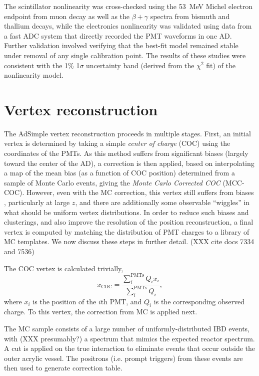 \documentclass[../thesis.tex]{subfiles}
\begin{document}
The scintillator nonlinearity was cross-checked using the 53~MeV Michel electron
endpoint from muon decay as well as the $\beta+\gamma$ spectra from bismuth and
thallium decays, while the electronics nonlinearity was validated using data
from a fast ADC system that directly recorded the PMT waveforms in one
AD. Further validation involved verifying that the best-fit model remained
stable under removal of any single calibration point. The results of these
studies were consistent with the 1\% 1$\sigma$ uncertainty band (derived from
the $\chi^2$ fit) of the nonlinearity model.

\section{Vertex reconstruction}
\label{sec:reconVertex}

The AdSimple vertex reconstruction proceeds in multiple stages. First, an
initial vertex is determined by taking a simple \emph{center of charge} (COC)
using the coordinates of the PMTs. As this method suffers from significant
biases (largely toward the center of the AD), a correction is then applied,
based on interpolating a map of the mean bias (as a function of COC position)
determined from a sample of Monte Carlo events, giving the \emph{Monte Carlo
  Corrected COC} (MCC-COC). However, even with the MC correction, this vertex
still suffers from biases , particularly at large $z$, and there are
additionally some observable ``wiggles'' in what should be uniform vertex
distributions. In order to reduce such biases and clusterings, and also improve
the resolution of the position reconstruction, a final vertex is computed by
matching the distribution of PMT charges to a library of MC templates. We now
discuss these steps in further detail. (XXX cite docs 7334 and 7536)


The COC vertex is calculated trivially,
\begin{equation*}
  x_{\mathrm{COC}} = \frac{\sum_{i}^{\mathrm{PMTs}} Q_i x_i}{\sum_i^{\mathrm{PMTs}} Q_i},
\end{equation*}
where $x_i$ is the position of the $i$th PMT, and $Q_i$ is the corresponding
observed charge. To this vertex, the correction from MC is applied next.

The MC sample consists of a large number of uniformly-distributed IBD events,
with (XXX presumably?) a spectrum that mimics the expected reactor spectrum. A
cut is applied on the true interaction to eliminate events that occur outside
the outer acrylic vessel. The positrons (i.e. prompt triggers) from these events
are then used to generate correction table.
\end{document}
